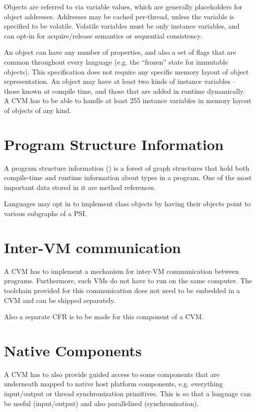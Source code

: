 Objects are referred to via variable values, which are generally placeholders for object addresses. Addresses may be cached per-thread, unless the variable is specified to be volatile. Volatile variables must be only instance variables, and can opt-in for acquire/release semantics or sequential consistency. 

An object can have any number of properties, and also a set of flags that are common throughout every language (e.g. the ``frozen'' state for immutable objects). This specification does not require any specific memory layout of object representation. An object may have at least two kinds of instance variables -- those known at compile time, and those that are added in runtime dynamically. A CVM has to be able to handle at least 255 instance variables in memory layout of objects of any kind. 






\section{Program Structure Information}
\label{sec:psi}

A program structure information () is a forest of graph structures that hold both compile-time and runtime information about types in a program. One of the most important data stored in it are method references. 

Languages may opt in to implement class objects by having their objects point to various subgraphs of a PSI. 





\section{Inter-VM communication} %

A CVM has to implement a mechanism for inter-VM communication between programs. Furthermore, such VMs do not have to run on the same computer. The toolchain provided for this communication does not need to be embedded in a CVM and can be shipped separately. 

Also a separate CFR is to be made for this component of a CVM. 





\section{Native Components} %

A CVM has to also provide guided access to some components that are underneath mapped to native host platform components, e.g. everything input/output or thread synchronization primitives. This is so that a language can be useful (input/output) and also parallelized (synchronization). 






